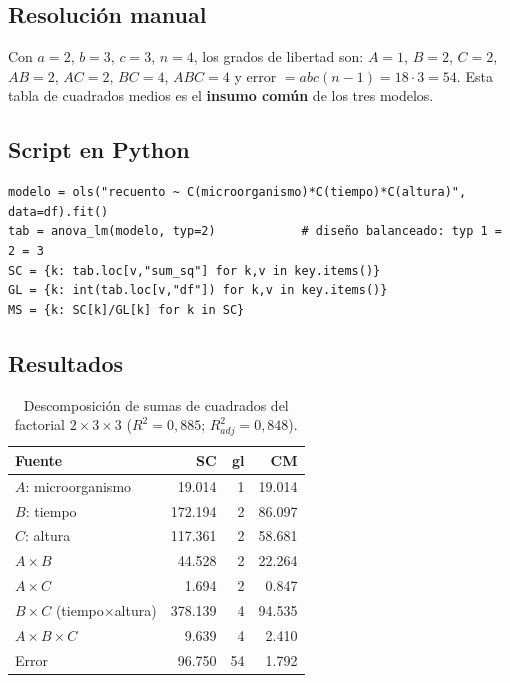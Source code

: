 \documentclass[12pt,a4paper]{article}
\begin{document}
\subsection{Resolución manual}

Con $a=2$, $b=3$, $c=3$, $n=4$, los grados de libertad son: $A=1$, $B=2$, $C=2$, $AB=2$, $AC=2$, $BC=4$, $ABC=4$ y error $=abc(n-1)=18\cdot3=54$. Esta tabla de cuadrados medios es el \textbf{insumo común} de los tres modelos.

\subsection{Script en Python}

\begin{lstlisting}[caption={Descomposición factorial y extracción de cuadrados medios.}]
modelo = ols("recuento ~ C(microorganismo)*C(tiempo)*C(altura)", data=df).fit()
tab = anova_lm(modelo, typ=2)            # diseño balanceado: typ 1 = 2 = 3
SC = {k: tab.loc[v,"sum_sq"] for k,v in key.items()}
GL = {k: int(tab.loc[v,"df"]) for k,v in key.items()}
MS = {k: SC[k]/GL[k] for k in SC}
\end{lstlisting}

\subsection{Resultados}

\begin{table}[H]
\centering
\caption{Descomposición de sumas de cuadrados del factorial $2\times3\times3$ ($R^2=0{,}885$; $R^2_{adj}=0{,}848$).}
\begin{tabular}{lrrr}
\toprule
\textbf{Fuente} & \textbf{SC} & \textbf{gl} & \textbf{CM}\\
\midrule
$A$: microorganismo            & 19.014  & 1  & 19.014\\
$B$: tiempo                    & 172.194 & 2  & 86.097\\
$C$: altura                    & 117.361 & 2  & 58.681\\
$A\times B$                    & 44.528  & 2  & 22.264\\
$A\times C$                    & 1.694   & 2  & 0.847\\
$B\times C$ (tiempo$\times$altura) & 378.139 & 4  & 94.535\\
$A\times B\times C$            & 9.639   & 4  & 2.410\\
Error                          & 96.750  & 54 & 1.792\\
\bottomrule
\end{tabular}
\end{table}
\end{document}
